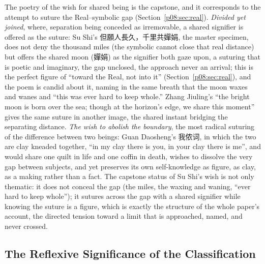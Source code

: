The poetry of the wish for shared being is the capstone, and it corresponds to the attempt to suture the Real--symbolic gap (Section~\ref{p08:sec:real}). \emph{Divided yet joined}, where, separation being conceded as irremovable, a shared signifier is offered as the suture: Su Shi's \cjkfont 但願人長久，千里共嬋娟\normalfont, the master specimen, does not deny the thousand miles (the symbolic cannot close that real distance) but offers the shared moon (\cjkfont 嬋娟\normalfont) as the signifier both gaze upon, a suturing that is poetic and imaginary, the gap unclosed, the approach never an arrival; this is the perfect figure of ``toward the Real, not into it'' (Section~\ref{p08:sec:real}), and the poem is candid about it, naming in the same breath that the moon waxes and wanes and ``this was ever hard to keep whole.'' Zhang Jiuling's ``the bright moon is born over the sea; though at the horizon's edge, we share this moment'' gives the same suture in another image, the shared instant bridging the separating distance. \emph{The wish to abolish the boundary}, the most radical suturing of the difference between two beings: Guan Daosheng's \cjkfont 我侬词\normalfont, in which the two are clay kneaded together, ``in my clay there is you, in your clay there is me'', and would share one quilt in life and one coffin in death, wishes to dissolve the very gap between subjects, and yet preserves its own self-knowledge as figure, as clay, as a making rather than a fact. The capstone status of Su Shi's wish is not only thematic: it does not conceal the gap (the miles, the waxing and waning, ``ever hard to keep whole''); it sutures across the gap with a shared signifier while knowing the suture is a figure, which is exactly the structure of the whole paper's account, the directed tension toward a limit that is approached, named, and never crossed.

\subsection{The Reflexive Significance of the Classification}\label{p08:sec:case-reflexive}


